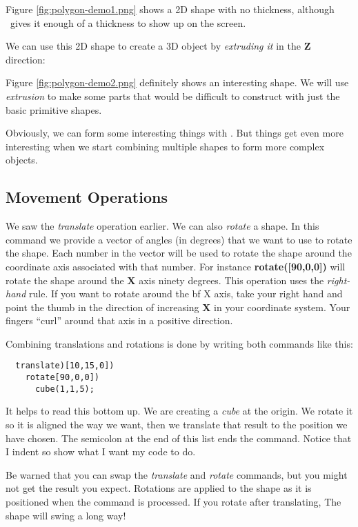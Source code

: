 Figure \ref{fig:polygon-demo1.png} shows a  2D shape with no thickness, although
\osc\ gives it enough of a thickness to show up on the screen.

We can use this 2D shape to create a 3D object by {\it extruding it} in the
{\bf Z} direction:


Figure \ref{fig:polygon-demo2.png} definitely shows an interesting shape. We
will use {\it extrusion} to make some parts that would be difficult to construct
with just the basic primitive shapes.


Obviously, we can form some interesting things with \osc. But things get
even more interesting when we start combining multiple shapes to form more
complex objects.

\subsection{Movement Operations}

We saw the {\it translate} operation earlier. We can also {\it rotate} a shape.
In this command we provide a vector of angles (in degrees) that we want to use
to rotate the shape. Each number in the vector will be used to rotate the shape
around the coordinate axis associated with that number. For instance {\bf
rotate([90,0,0])} will rotate the shape around the {\bf X} axis ninety degrees.
This operation uses the {\it right-hand} rule. If you want to rotate around the
{bf X} axis, take your right hand and point the thumb in the direction of
increasing {\bf X} in your coordinate system. Your fingers ``curl'' around that
axis in a positive direction.

Combining translations and rotations is done by writing both commands like
this:

\begin{lstlisting}
  translate)[10,15,0])
    rotate[90,0,0])
      cube(1,1,5);
\end{lstlisting}

It helps to read this bottom up. We are creating a {\it cube} at the origin. We
rotate it so it is aligned the way we want, then we translate that result to
the position we have chosen. The semicolon at the end of this list ends the
command. Notice that I indent so show what I want my code to do.

Be warned that you can swap the {\it translate} and {\it rotate} commands, but
you might not get the result you expect. Rotations are applied to the shape as
it is positioned when the command is processed. If you rotate after
translating, The shape will swing a long way!

